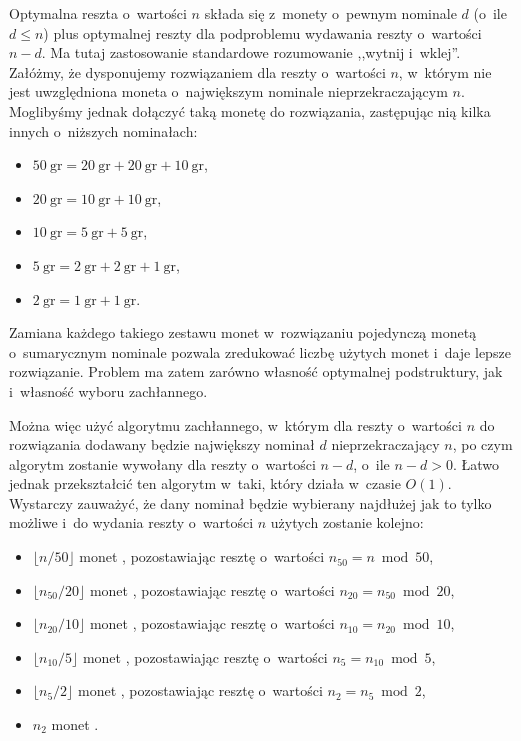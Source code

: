 
\subproblem %
Optymalna reszta o~wartości $n$ składa się z~monety o~pewnym nominale $d$ (o~ile $d\le n$) plus optymalnej reszty dla podproblemu wydawania reszty o~wartości $n-d$.
Ma tutaj zastosowanie standardowe rozumowanie ,,wytnij i~wklej''.
Załóżmy, że dysponujemy rozwiązaniem dla reszty o~wartości $n$, w~którym nie jest uwzględniona moneta o~największym nominale nieprzekraczającym $n$.
Moglibyśmy jednak dołączyć taką monetę do rozwiązania, zastępując nią kilka innych o~niższych nominałach:
\begin{itemize}
	\item $50\ \mathrm{gr}=20\ \mathrm{gr}+20\ \mathrm{gr}+10\ \mathrm{gr}$,
	\item $20\ \mathrm{gr}=10\ \mathrm{gr}+10\ \mathrm{gr}$,
	\item $10\ \mathrm{gr}=5\ \mathrm{gr}+5\ \mathrm{gr}$,
	\item $5\ \mathrm{gr}=2\ \mathrm{gr}+2\ \mathrm{gr}+1\ \mathrm{gr}$,
	\item $2\ \mathrm{gr}=1\ \mathrm{gr}+1\ \mathrm{gr}$.
\end{itemize}
Zamiana każdego takiego zestawu monet w~rozwiązaniu pojedynczą monetą o~sumarycznym nominale pozwala zredukować liczbę użytych monet i~daje lepsze rozwiązanie.
Problem ma zatem zarówno własność optymalnej podstruktury, jak i~własność wyboru zachłannego.

Można więc użyć algorytmu zachłannego, w~którym dla reszty o~wartości $n$ do rozwiązania dodawany będzie największy nominał $d$ nieprzekraczający $n$, po czym algorytm zostanie wywołany dla reszty o~wartości $n-d$, o~ile $n-d>0$.
Łatwo jednak przekształcić ten algorytm w~taki, który działa w~czasie $O(1)$.
Wystarczy zauważyć, że dany nominał będzie wybierany najdłużej jak to tylko możliwe i~do wydania reszty o~wartości $n$ użytych zostanie kolejno:
\begin{itemize}
	\item $\lfloor n/50\rfloor$ monet , pozostawiając resztę o~wartości $n_{50}=n\bmod50$,
	\item $\lfloor n_{50}/20\rfloor$ monet , pozostawiając resztę o~wartości $n_{20}=n_{50}\bmod20$,
	\item $\lfloor n_{20}/10\rfloor$ monet , pozostawiając resztę o~wartości $n_{10}=n_{20}\bmod10$,
	\item $\lfloor n_{10}/5\rfloor$ monet , pozostawiając resztę o~wartości $n_5=n_{10}\bmod5$,
	\item $\lfloor n_5/2\rfloor$ monet , pozostawiając resztę o~wartości $n_2=n_5\bmod2$,
	\item $n_2$ monet .
\end{itemize}

